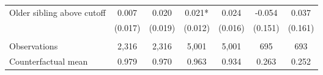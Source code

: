 {{\begin{tabular}{lcccccc}
Older sibling above cutoff&       0.007   &       0.020   &       0.021*  &       0.024   &      -0.054   &       0.037   \\
                    &     (0.017)   &     (0.019)   &     (0.012)   &     (0.016)   &     (0.151)   &     (0.161)   \\
                    &               &               &               &               &               &               \\
Observations        &       2,316   &       2,316   &       5,001   &       5,001   &         695   &         693   \\
Counterfactual mean &       0.979   &       0.970   &       0.963   &       0.934   &       0.263   &       0.252   \\
 

\bottomrule
\end{tabular}
}
}
